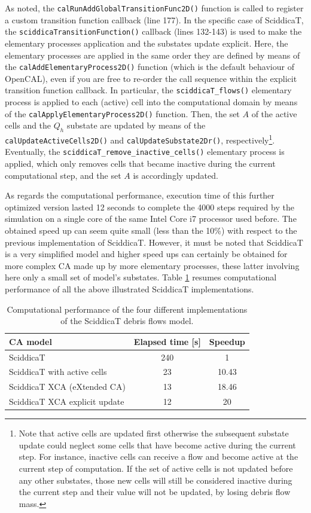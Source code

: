 As noted, the \verb'calRunAddGlobalTransitionFunc2D()' function is
called to register a custom transition function callback (line
177). In the specific case of SciddicaT, the
\verb'sciddicaTransitionFunction()' callback (lines 132-143) is used
to make the elementary processes application and the substates update
explicit. Here, the elementary processes are applied in the same order
they are defined by means of the \verb'calAddElementaryProcess2D()'
function (which is the default behaviour of OpenCAL), even if you are
free to re-order the call sequence within the explicit transition
function callback. In particular, the \verb'sciddicaT_flows()'
elementary process is applied to each (active) cell into the
computational domain by means of the
\verb'calApplyElementaryProcess2D()' function. Then, the set $A$ of
the active cells and the $Q_h$ substate are updated by means of the
\verb'calUpdateActiveCells2D()' and \verb'calUpdateSubstate2Dr()',
respectively\footnote{Note that active cells are updated first
  otherwise the subsequent substate update could neglect some cells
  that have become active during the current step. For instance,
  inactive cells can receive a flow and become active at the current
  step of computation. If the set of active cells is not updated
  before any other substates, those new cells will still be considered
  inactive during the current step and their value will not be
  updated, by losing debris flow mass.}. Eventually, the
\verb'sciddicaT_remove_inactive_cells()' elementary process is
applied, which only removes cells that became inactive during the
current computational step, and the set $A$ is accordingly updated.


As regards the computational performance, execution time of this
further optimized version lasted 12 seconds to complete the 4000 steps
required by the simulation on a single core of the same Intel Core i7
processor used before. The obtained speed up can seem quite small
(less than the 10\%) with respect to the previous implementation of
SciddicaT. However, it must be noted that SciddicaT is a very
simplified model and higher speed ups can certainly be obtained for
more complex CA made up by more elementary processes, these latter
involving here only a small set of model's substates. Table
\ref{tab:speedup} resumes computational performance of all the above
illustrated SciddicaT implementations.

\begin{table}
  \centering
  \begin{tabular}{l|c|c}
    \hline
    CA model & Elapsed time [s] & Speedup \\
    \hline
    \hline
    SciddicaT                     & 240 & 1\\
    SciddicaT with active cells   & 23  & 10.43\\
    SciddicaT XCA (eXtended CA)   & 13  & 18.46\\
    SciddicaT XCA explicit update & 12  & 20\\
    \hline
  \end{tabular}
  \caption{Computational performance of the four different
    implementations of the SciddicaT debris flows model.}
  \label{tab:speedup}
\end{table} 


